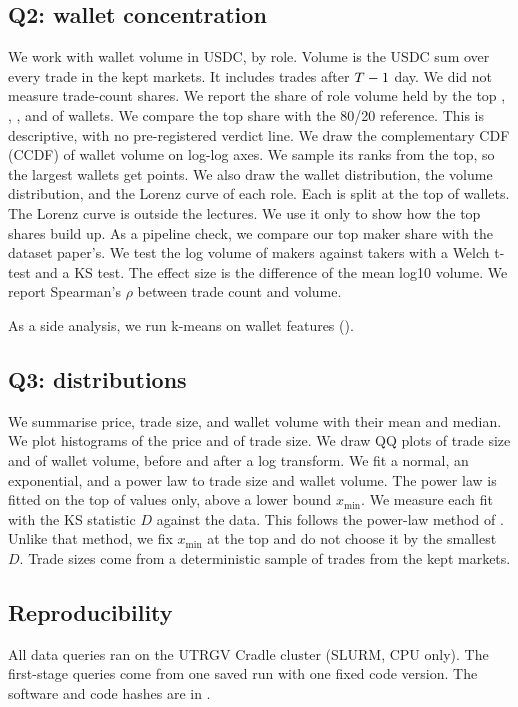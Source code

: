 \subsection{Q2: wallet concentration}\label{sec:methods-q2}
We work with wallet volume in USDC, by role.
Volume is the USDC sum over every trade in the kept markets.
It includes trades after $T-1$ day.
We did not measure trade-count shares.
We report the share of role volume held by the top \TopOneLabel, \TopFiveLabel, \TopTenLabel, and \TopTwentyLabel{} of wallets.
We compare the top \TopTwentyLabel{} share with the 80/20 reference.
This is descriptive, with no pre-registered verdict line.
We draw the complementary CDF (CCDF) of wallet volume on log-log axes.
We sample its ranks from the top, so the largest wallets get points.
We also draw the wallet distribution, the volume distribution, and the Lorenz curve of each role.
Each is split at the top \TopTwentyLabel{} of wallets.
The Lorenz curve is outside the lectures.
We use it only to show how the top shares build up.
As a pipeline check, we compare our top \TopOneLabel{} maker share with the dataset paper's.
We test the log volume of makers against takers with a Welch t-test and a KS test.
The effect size is the difference of the mean log10 volume.
We report Spearman's $\rho$ between trade count and volume.

As a side analysis, we run k-means on wallet features ().

\subsection{Q3: distributions}\label{sec:methods-q3}
We summarise price, trade size, and wallet volume with their mean and median.
We plot histograms of the price \pOne{} and of trade size.
We draw QQ plots of trade size and of wallet volume, before and after a log transform.
We fit a normal, an exponential, and a power law to trade size and wallet volume.
The power law is fitted on the top \TopTenLabel{} of values only, above a lower bound $x_{\min}$.
We measure each fit with the KS statistic $D$ against the data.
This follows the power-law method of \citet{clauset2009power}.
Unlike that method, we fix $x_{\min}$ at the top \TopTenLabel{} and do not choose it by the smallest $D$.
Trade sizes come from a deterministic sample of \NTradeSizeSample{} trades from the kept markets.

\subsection{Reproducibility}\label{sec:methods-repro}
All data queries ran on the UTRGV Cradle cluster (SLURM, CPU only).
The first-stage queries come from one saved run with one fixed code version.
The software and code hashes are in .
